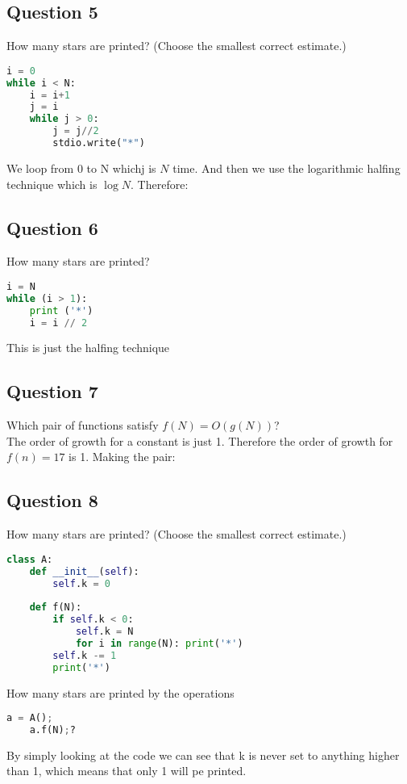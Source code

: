 \subsection{Question 5}
How many stars are printed? (Choose the smallest correct estimate.)
\begin{lstlisting}[language=python]
i = 0
while i < N:
    i = i+1
    j = i 
    while j > 0: 
        j = j//2
        stdio.write("*")
\end{lstlisting}
We loop from 0 to N whichj is $N$ time. And then we use the logarithmic halfing technique which is $\log N$. Therefore:\\[1ex]


\subsection{Question 6}
How many stars are printed?
\begin{lstlisting}[language=python]
i = N
while (i > 1):
    print ('*')
    i = i // 2
\end{lstlisting}
This is just the halfing technique\\[1ex]


\subsection{Question 7}
Which pair of functions satisfy $f(N) = O(g(N))$?\\
The order of growth for a constant is just 1. Therefore the order of growth for $f(n)=17$ is 1. Making the pair:\\[1ex]


\subsection{Question 8}
How many stars are printed? (Choose the smallest correct estimate.)
\begin{lstlisting}[language=python]
class A:
    def __init__(self):
        self.k = 0
    
    def f(N):
        if self.k < 0:
            self.k = N
            for i in range(N): print('*') 
        self.k -= 1
        print('*') 
\end{lstlisting}
How many stars are printed by the operations 
\begin{lstlisting}[language=python]
    a = A(); 
    a.f(N);?
\end{lstlisting}
By simply looking at the code we can see that k is never set to anything higher than 1, which means that only 1 will pe printed.\\[1ex]


